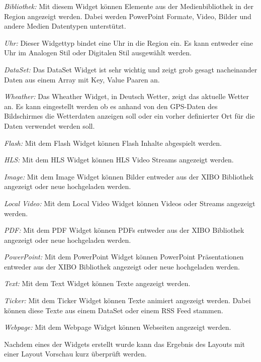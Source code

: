 \begin{widgettypes}
	\item {\em Bibliothek:} Mit diesem Widget können Elemente aus der Medienbibliothek in der Region angezeigt werden. Dabei werden PowerPoint Formate, Video, Bilder und andere Medien Datentypen unterstützt.
	
	\item {\em Uhr:} 
	Dieser Widgettyp bindet eine Uhr in die Region ein. Es kann entweder eine Uhr im Analogen Stil oder Digitalen Stil ausgewählt werden.
	
	\item {\em DataSet:} 
	Das DataSet Widget ist sehr wichtig und zeigt grob gesagt nacheinander Daten aus einem Array mit Key, Value Paaren an.
	
	\item {\em Wheather:} 
	Das Wheather Widget, in Deutsch Wetter, zeigt das aktuelle Wetter an. Es kann eingestellt werden ob es anhand von den GPS-Daten des Bildschirmes die Wetterdaten anzeigen soll oder ein vorher definierter Ort für die Daten verwendet werden soll.
	
	\item {\em Flash:} 
	Mit dem Flash Widget können Flash Inhalte abgespielt werden.
	
	\item {\em HLS:} 
	Mit dem HLS Widget können HLS Video Streams angezeigt werden.
	
	\item {\em Image:} 
	Mit dem Image Widget können Bilder entweder aus der XIBO Bibliothek angezeigt oder neue hochgeladen werden.
	
	\item {\em Local Video:} 
	Mit dem Local Video Widget können Videos oder Streams angezeigt werden.
	
	\item {\em PDF:} 
	Mit dem PDF Widget können PDFs entweder aus der XIBO Bibliothek angezeigt oder neue hochgeladen werden.
	
	\item {\em PowerPoint:} 
	Mit dem PowerPoint Widget können PowerPoint Präsentationen entweder aus der XIBO Bibliothek angezeigt oder neue hochgeladen werden.

	\item {\em Text:} 
	Mit dem Text Widget können Texte angezeigt werden.
	
	\item {\em Ticker:} 
	Mit dem Ticker Widget können Texte animiert angezeigt werden. Dabei können diese Texte aus einem DataSet oder einem RSS Feed stammen.
	
	\item {\em Webpage:} 
	Mit dem Webpage Widget können Webseiten angezeigt werden.
\end{widgettypes}

Nachdem eines der Widgets erstellt wurde kann das Ergebnis des Layouts mit einer Layout Vorschau kurz überprüft werden.
